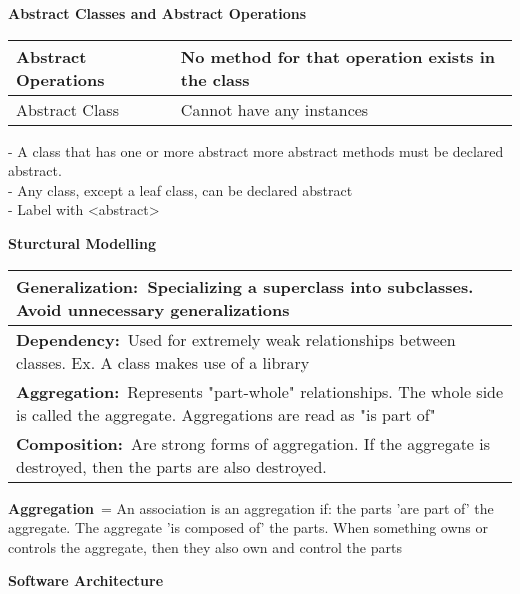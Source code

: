 \textbf{Abstract Classes and Abstract
	Operations}\label{abstract-classes-and-abstract-operations}

\begin{longtable}[]{@{}ll@{}}
	\toprule
	Abstract Operations & No method for that operation exists in the
	class\tabularnewline
	\midrule
	\endhead
	Abstract Class & Cannot have any instances\tabularnewline
	\bottomrule
\end{longtable}

- A class that has one or more abstract more abstract methods must be
declared abstract.\\
- Any class, except a leaf class, can be declared abstract\\
- Label with \textless{}ab­str­act\textgreater{}

\textbf{Sturctural Modelling}\label{sturctural-modelling}

\begin{longtable}[]{@{}l@{}}
	\toprule
	\textbf{Gene­ral­iza­tion:}~Specia­lizing a superclass into subcla­sses.
	Avoid unnece­ssary genera­liz­ations\tabularnewline
	\midrule
	\endhead
	\textbf{Depe­nde­ncy:}~Used for extremely weak relati­­on­ships between
	classes. Ex. A class makes use of a library\tabularnewline
	\textbf{Aggr­ega­tion:}~Represents "­par­t-w­hol­e" relati­ons­hips. The
	whole side is called the aggregate. Aggreg­ations are read as "is part
	of"\tabularnewline
	\textbf{Comp­osi­tion:}~Are strong forms of aggreg­ation. If the
	aggregate is destroyed, then the parts are also
	destroyed.\tabularnewline
	\bottomrule
\end{longtable}

\textbf{Aggr­ega­tion}~= An associ­ation is an aggreg­ation if: the
parts 'are part of' the aggregate. The aggregate 'is composed of' the
parts. When something owns or controls the aggregate, then they also own
and control the parts

\textbf{Software Archit­ecture}\label{software-architecture}

